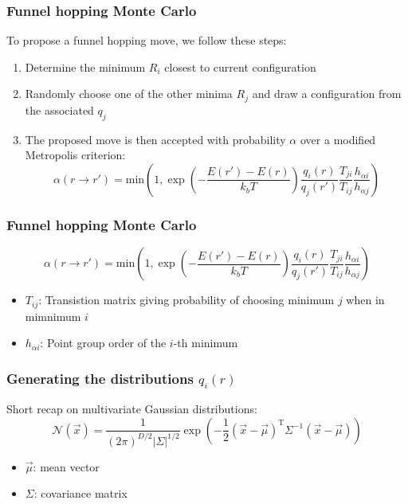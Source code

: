 \documentclass{beamer}
\begin{document}
	\begin{frame}
		\frametitle{Funnel hopping Monte Carlo}
		To propose a funnel hopping move, we follow these steps:
		\begin{enumerate}
			\item Determine the minimum $R_i$ closest to current configuration
			\item Randomly choose one of the other minima $R_j$ and draw a configuration from the associated $q_j$
			\item The proposed move is then accepted with probability $\alpha$ over a modified Metropolis criterion:
				\begin{equation}
					{\scriptstyle
					\alpha(r\rightarrow r')=\text{min}\left(1,\exp\left(-\frac{E(r')-E(r)}{k_bT}\right)\frac{q_i(r)}{q_j(r')}\frac{T_{ji}}{T_{ij}}\frac{h_{\alpha i}}{h_{\alpha j}}\right)
					}
				\end{equation}
		\end{enumerate}
	\end{frame}

	\begin{frame}
		\frametitle{Funnel hopping Monte Carlo}
			$$
				\alpha(r\rightarrow r')=\text{min}\left(1,\exp\left(-\frac{E(r')-E(r)}{k_bT}\right)\frac{q_i(r)}{q_j(r')}\frac{T_{ji}}{T_{ij}}\frac{h_{\alpha i}}{h_{\alpha j}}\right)
			$$
			\begin{itemize}
				\item $T_{ij}$: Transistion matrix giving probability of choosing minimum $j$ when in mimnimum $i$
				\item $h_{\alpha i}$: Point group order of the $i$-th minimum
			\end{itemize}
	\end{frame}

	\begin{frame}
		\frametitle{Generating the distributions $q_i(r)$}
		Short recap on multivariate Gaussian distributions:
		\begin{equation}
			\mathcal{N}(\vec{x})=\frac{1}{(2\pi)^{D/2}|\Sigma|^{1/2}}\exp\left(-\frac{1}{2}(\vec{x}-\vec{\mu})^\text{T} \Sigma^{-1}(\vec{x}-\vec{\mu})\right)
		\end{equation}
		\begin{itemize}
			\item $\vec{\mu}$: mean vector
			\item $\Sigma$: covariance matrix
		\end{itemize}
	\end{frame}
\end{document}
